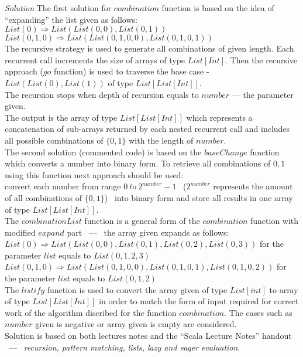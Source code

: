 \documentclass[a4paper]{article}
\begin{document}
\newline
{\large \emph{Solution}}
\newline
\newline
The first solution for $combination$ function is based on the idea of ``expanding'' the list given as follows: \\
\newline
$List(0) \Rightarrow List(List(0, 0), List(0, 1))$ \\
$List(0, 1, 0) \Rightarrow List(List(0, 1, 0, 0), List(0, 1, 0, 1))$ \\
\newline
The recursive strategy is used to generate all combinations of given length. Each recurrent call increments the size of arrays of type $List[Int]$.
Then the recursive approach ($go$ function) is used to traverse the base case - $List(List(0), List(1))$ of type $List[List[Int]]$. \\
The recursion stops when depth of recursion equals to $number$ --- the parameter given. \\
The output is the array of type $List[List[Int]]$ which represents a concatenation of sub-arrays returned by each nested recurrent call and includes all possible combinations of $\{0, 1\}$ with the length of $number$. \\
\newline
The second solution (commented code) is based on the $baseChange$ function which converts a number into binary form. To retrieve all combinations of ${0, 1}$ using this function next approach should be used: \\
convert each number from range $0 \ to \ 2^{number} - 1$ \ ($2^{number}$ represents the amount of all combinations of $\{0, 1\}$) \ into binary form and store all results in one array of type $List[List[Int]]$. \\
\newline
The $combinationList$ function is a general form of the $combination$ function with modified $expand$ part \ --- \ the array given expands as follows: \\
\newline
$List(0) \Rightarrow List(List(0, 0), List(0, 1), List(0, 2), List(0, 3))$ for the parameter $list$ equals to $List(0, 1, 2, 3)$ \\
$List(0, 1, 0) \Rightarrow List(List(0, 1, 0, 0), List(0, 1, 0, 1), List(0, 1, 0, 2))$ for the parameter $list$ equals to $List(0, 1, 2)$ \\
\newline
The $listify$ function is used to convert the array given of type $List[int]$ to array of type $List[List[Int]]$ in order to match the form of input required for correct work of the algorithm discribed for the function $combination$.
\newline
The cases such as $number$ given is negative or array given is empty are considered. \\
Solution is based on both lectures notes and the ``Scala Lecture Notes'' handout \ --- \ \emph{recursion, pattern matching, lists, lazy and eager evaluation}.  
\end{document}

